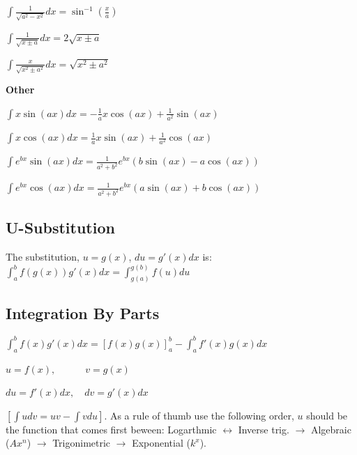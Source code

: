 \documentclass[8pt,a4paper]{extarticle}     %
\theoremstyle{definition}
\theoremstyle{definition}
\theoremstyle{definition}
\begin{document}
\begin{multicols}{4}
\begin{bulletlist}
	\item $\int \frac{1}{\sqrt{a^2-x^2}}dx = \sin^{-1}\left(\frac{x}{a}\right)$
	\item $\int \frac{1}{\sqrt{x\pm a}}dx = 2\sqrt{x\pm a}$
	\item $\int \frac{x}{\sqrt{x^2 \pm a^2}}dx = \sqrt{x^2 \pm a^2}$
	\item [] \textbf{Other}
	\item $\int x\sin(ax)dx = -\frac{1}{a}x\cos(ax)+\frac{1}{a^2}\sin(ax)$
	\item $\int x\cos(ax)dx = \frac{1}{a}x\sin(ax)+\frac{1}{a^2}\cos(ax) $
	\item $\int e^{bx} \sin(ax)dx = \frac{1}{a^2+b^2}e^{bx}\left(b\sin(ax)-a\cos(ax)\right)$
	\item $\int e^{bx} \cos(ax)dx = \frac{1}{a^2+b^2}e^{bx}\left(a\sin(ax)+b\cos(ax)\right)$
\end{bulletlist}

\vfill\null
\columnbreak

\subsection{U-Substitution}
The substitution, $u=g(x)$, $du=g'(x)dx$ is: \\
$\displaystyle\int_a^b f(g(x))g'(x)dx = \int_{g(a)}^{g(b)}f(u)du $
\subsection{Integration By Parts}
$\displaystyle\int_a^b f(x)g'(x)dx = \left[f(x)g(x)\right]_{a}^{b} - \int_a^b f'(x)g(x)dx$
\begin{bulletlist}
	\item $u=f(x), \qquad\quad v=g(x)$
	\item $du=f'(x)dx, \quad dv=g'(x)dx$
\end{bulletlist}
$[\int u dv = uv-\int v du]$. As a rule of thumb use the following order, $u$ should be the function that comes first beween: Logarthmic $\leftrightarrow$ Inverse trig. $\rightarrow$ Algebraic ($Ax^n$)  $\rightarrow$ Trigonimetric $\rightarrow$ Exponential ($k^x$).

\end{multicols}
\end{document}
